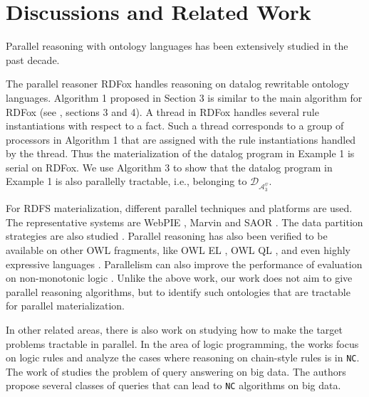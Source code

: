 \documentclass{article}
\begin{document}
\section{Discussions and Related Work}

Parallel reasoning with ontology languages has been extensively studied in the past decade.

The parallel reasoner RDFox \cite{DBLP:conf/aaai/MotikNPHO14} handles reasoning on datalog rewritable ontology languages.
Algorithm 1 proposed in Section 3 is similar to the main algorithm for RDFox (see \cite{DBLP:conf/aaai/MotikNPHO14}, sections 3 and 4). A thread in RDFox handles several rule instantiations with respect to a fact. Such a thread corresponds to a group of processors in Algorithm 1 that are assigned with the rule instantiations handled by the thread. Thus the materialization of the datalog program in Example 1 is serial on RDFox. We use Algorithm 3 to show that the datalog program in Example 1 is also parallelly tractable, i.e., belonging to $\mathcal{D}_{\mathcal{A}_3^{\psi}}$.

For RDFS materialization, different parallel techniques and platforms are used. The representative systems are WebPIE \cite{DBLP:journals/ws/UrbaniKMHB12}, Marvin \cite{oren2009marvin} and SAOR \cite{DBLP:journals/ijswis/HoganHP09}.
The data partition strategies are also studied \cite{DBLP:conf/ISCApdcs/SomaP08,DBLP:conf/semweb/WeaverH09}. Parallel reasoning has also been verified to be available on other OWL fragments, like OWL EL \cite{DBLP:journals/jar/KazakovKS14}, OWL QL \cite{DBLP:conf/dlog/LemboSS13}, and even highly expressive languages \cite{DBLP:conf/otm/LiebigM07,DBLP:conf/dlog/SchlichtS08,DBLP:conf/dlog/WuH12}. Parallelism can also improve the performance of evaluation on non-monotonic logic \cite{Tachmazidis-Stratified-ECAI2012}.
Unlike the above work, our work does not aim to give parallel reasoning algorithms, but to identify such ontologies
that are tractable for parallel materialization.

In other related areas, there is also work on studying how to make the target problems tractable in parallel. In the area of logic programming, the works \cite{DBLP:journals/algorithmica/UllmanG88,DBLP:journals/jacm/AfratiP93} focus on logic rules and analyze the cases where reasoning on chain-style rules is in \texttt{NC}. The work of \cite{DBLP:journals/jcst/FanH14} studies the problem of query answering on big data. The authors propose several classes of queries that can lead to \texttt{NC} algorithms on big data.
\end{document}
